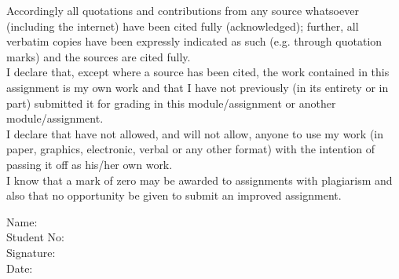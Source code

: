 Accordingly all quotations and contributions from any source whatsoever (including the internet) have been cited fully (acknowledged); further, all verbatim copies have been expressly indicated as such (e.g. through quotation marks) and the sources are cited fully.\\

I declare that, except where a source has been cited, the work contained in this assignment is my own work and that I have not previously (in its entirety or in part) submitted it for grading in this module/assignment or another module/assignment.\\

I declare that have not allowed, and will not allow, anyone to use my work (in paper, graphics, electronic, verbal or any other format) with the intention of passing it off as his/her own work.\\

I know that a mark of zero may be awarded to assignments with plagiarism and also that no opportunity be given to submit an improved assignment.\\

\begin{flushleft}
	
	Name:\hspace{1.52cm} \makebox[1.5in]{\hrulefill}\\
	Student No:\hspace{0.5cm} \makebox[1.5in]{\hrulefill}\\
	Signature:\hspace{0.85cm} \makebox[1.5in]{\hrulefill}\\
	Date:\hspace{1.7cm} \makebox[1.5in]{\hrulefill}\\
	
\end{flushleft}
\newpage


